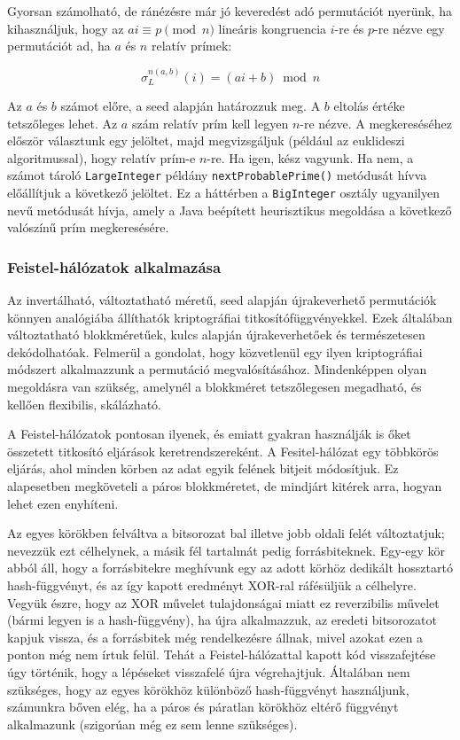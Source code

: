 \documentclass[
    parspace,
    noindent,
    nohyp,
]{elteiktdk}[2023/04/10]
\begin{document}
Gyorsan számolható, de ránézésre már jó keveredést adó permutációt nyerünk, ha kihasználjuk, hogy az $ai \equiv p \pmod{n}$ lineáris kongruencia
$i$-re és $p$-re nézve egy permutációt ad, ha $a$ és $n$ relatív prímek:

$$
\sigma_L^{n(a,b)}(i) = (ai + b) \bmod n
$$

Az $a$ és $b$ számot előre, a seed alapján határozzuk meg.
A $b$ eltolás értéke tetszőleges lehet.
Az $a$ szám relatív prím kell legyen $n$-re nézve.
A megkereséséhez először választunk egy jelöltet,
majd megvizsgáljuk (például az euklideszi algoritmussal), hogy relatív prím-e $n$-re.
Ha igen, kész vagyunk.
Ha nem, a számot tároló \texttt{LargeInteger} példány
\texttt{nextProbablePrime()} metódusát hívva előállítjuk a következő jelöltet.
Ez a háttérben a \texttt{BigInteger} osztály ugyanilyen nevű metódusát hívja, amely a Java beépített heurisztikus megoldása a következő valószínű prím megkeresésére.

\subsubsection{Feistel-hálózatok alkalmazása}

Az invertálható, változtatható méretű, seed alapján újrakeverhető permutációk könnyen analógiába állíthatók kriptográfiai titkosítófüggvényekkel.
Ezek általában változtatható blokkméretűek, kulcs alapján újrakeverhetőek és természetesen dekódolhatóak.
Felmerül a gondolat, hogy közvetlenül egy ilyen kriptográfiai módszert alkalmazzunk a permutáció megvalósításához.
Mindenképpen olyan megoldásra van szükség, amelynél a blokkméret tetszőlegesen megadható, és kellően flexibilis, skálázható.

A Feistel-hálózatok pontosan ilyenek, és emiatt gyakran használják is őket összetett titkosító eljárások keretrendszereként.
A Fesitel-hálózat egy többkörös eljárás, ahol minden körben az adat egyik felének bitjeit módosítjuk.
Ez alapesetben megköveteli a páros blokkméretet, de mindjárt kitérek arra, hogyan lehet ezen enyhíteni.

Az egyes körökben felváltva a bitsorozat bal illetve jobb oldali felét változtatjuk; nevezzük ezt célhelynek, a másik fél tartalmát pedig forrásbiteknek.
Egy-egy kör abból áll, hogy a forrásbitekre meghívunk egy az adott körhöz dedikált hossztartó hash-függvényt,
és az így kapott eredményt XOR-ral ráfésüljük a célhelyre.
Vegyük észre, hogy az XOR művelet tulajdonságai miatt ez reverzibilis művelet (bármi legyen is a hash-függvény),
ha újra alkalmazzuk, az eredeti bitsorozatot kapjuk vissza,
és a forrásbitek még rendelkezésre állnak, mivel azokat ezen a ponton még nem írtuk felül.
Tehát a Feistel-hálózattal kapott kód visszafejtése úgy történik, hogy a lépéseket visszafelé újra végrehajtjuk.
Általában nem szükséges, hogy az egyes körökhöz különböző hash-függvényt használjunk,
számunkra bőven elég, ha a páros és páratlan körökhöz eltérő függvényt alkalmazunk (szigorúan még ez sem lenne szükséges).
\end{document}
